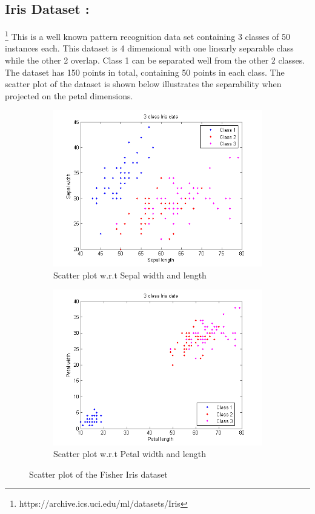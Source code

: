 \documentclass{article} %
\begin{document}
 \newpage
\subsection{Iris Dataset :} \footnote{https://archive.ics.uci.edu/ml/datasets/Iris}
This is a well known pattern recognition data set containing 3 classes of 50 instances each. This dataset is 4 dimensional with one linearly separable class while the other 2 overlap. Class 1 can be separated well from the other 2 classes. The dataset has 150 points in total, containing 50 points in each class.
The scatter plot of the dataset is shown below illustrates the separability when projected on the petal dimensions.




\begin{figure}[H]
\begin{subfigure}{.5\textwidth}
  \centering
  \includegraphics[width=\linewidth]{Plots/FisherIris/iris_1}
\caption{Scatter plot w.r.t Sepal width and length} 
\end{subfigure}%
\begin{subfigure}{.5\textwidth}
  \centering
  \includegraphics[width=\linewidth]{Plots/FisherIris/iris_2}
\caption{Scatter plot w.r.t Petal width and length}  
\end{subfigure}
\caption{Scatter plot of the Fisher Iris dataset}
\end{figure}
\end{document}
